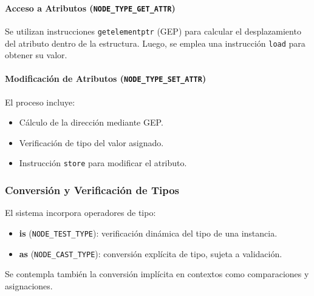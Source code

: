 \documentclass{llncs}
\begin{document}
\paragraph{Acceso a Atributos (\texttt{NODE\_TYPE\_GET\_ATTR})}

Se utilizan instrucciones \texttt{getelementptr} (GEP) para calcular el desplazamiento del atributo dentro de la estructura. Luego, se emplea una instrucción \texttt{load} para obtener su valor.

\paragraph{Modificación de Atributos (\texttt{NODE\_TYPE\_SET\_ATTR})}

El proceso incluye:
\begin{itemize}
    \item Cálculo de la dirección mediante GEP.
    \item Verificación de tipo del valor asignado.
    \item Instrucción \texttt{store} para modificar el atributo.
\end{itemize}

\subsubsection{Conversión y Verificación de Tipos}

El sistema incorpora operadores de tipo:
\begin{itemize}
    \item \textbf{is} (\texttt{NODE\_TEST\_TYPE}): verificación dinámica del tipo de una instancia.
    \item \textbf{as} (\texttt{NODE\_CAST\_TYPE}): conversión explícita de tipo, sujeta a validación.
\end{itemize}

Se contempla también la conversión implícita en contextos como comparaciones y asignaciones.
\end{document}
